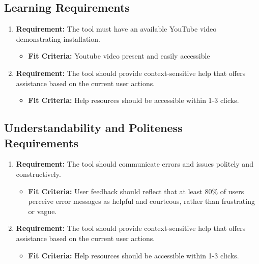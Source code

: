 \documentclass[12pt]{article}
\begin{document}
\subsection{Learning Requirements}
\begin{enumerate}
  \item \textbf{Requirement:} The tool must have an available YouTube video demonstrating installation.
  \begin{itemize}[label={}]
      \item \textbf{Fit Criteria:} Youtube video present and easily accessible
  \end{itemize}
  \item \textbf{Requirement:} The tool should provide context-sensitive help that offers assistance based on the current user actions.
  \begin{itemize}[label={}]
      \item \textbf{Fit Criteria:} Help resources should be accessible within 1-3 clicks.
  \end{itemize}
\end{enumerate}
\subsection{Understandability and Politeness Requirements}
\begin{enumerate}
  \item \textbf{Requirement:} The tool should communicate errors and issues politely and constructively.
  \begin{itemize}[label={}]
      \item \textbf{Fit Criteria:} User feedback should reflect that at least 80\% of users perceive error messages as helpful and courteous, rather than frustrating or vague.
  \end{itemize}
  \item \textbf{Requirement:} The tool should provide context-sensitive help that offers assistance based on the current user actions.
  \begin{itemize}[label={}]
      \item \textbf{Fit Criteria:} Help resources should be accessible within 1-3 clicks.
  \end{itemize}
\end{enumerate}
\end{document}
